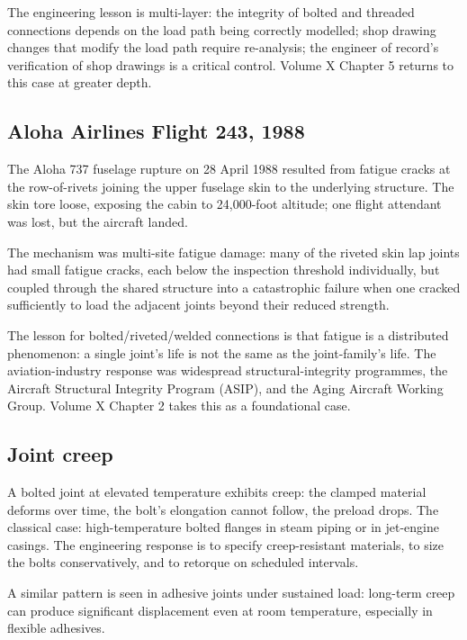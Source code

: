 The engineering lesson is multi-layer: the integrity of bolted and threaded connections depends on the load path being correctly modelled; shop drawing changes that modify the load path require re-analysis; the engineer of record's verification of shop drawings is a critical control. Volume X Chapter 5 returns to this case at greater depth.

\subsection{Aloha Airlines Flight 243, 1988}

The Aloha 737 fuselage rupture on 28 April 1988 \cite{acc:ntsb-aar94-04} resulted from fatigue cracks at the row-of-rivets joining the upper fuselage skin to the underlying structure. The skin tore loose, exposing the cabin to 24,000-foot altitude; one flight attendant was lost, but the aircraft landed.

The mechanism was multi-site fatigue damage: many of the riveted skin lap joints had small fatigue cracks, each below the inspection threshold individually, but coupled through the shared structure into a catastrophic failure when one cracked sufficiently to load the adjacent joints beyond their reduced strength.

The lesson for bolted/riveted/welded connections is that fatigue is a distributed phenomenon: a single joint's life is not the same as the joint-family's life. The aviation-industry response was widespread structural-integrity programmes, the Aircraft Structural Integrity Program (ASIP), and the Aging Aircraft Working Group. Volume X Chapter 2 takes this as a foundational case.

\subsection{Joint creep}

A bolted joint at elevated temperature exhibits creep: the clamped material deforms over time, the bolt's elongation cannot follow, the preload drops. The classical case: high-temperature bolted flanges in steam piping or in jet-engine casings. The engineering response is to specify creep-resistant materials, to size the bolts conservatively, and to retorque on scheduled intervals.

A similar pattern is seen in adhesive joints under sustained load: long-term creep can produce significant displacement even at room temperature, especially in flexible adhesives.

